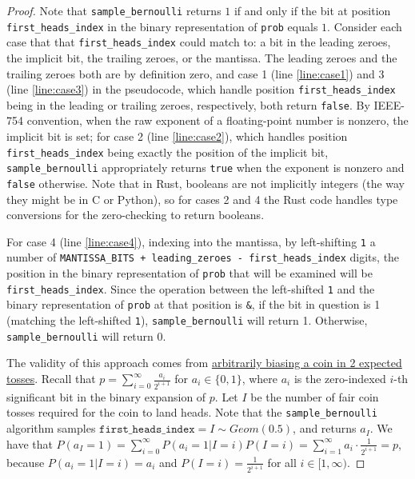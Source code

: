 \documentclass[11pt,a4paper]{article}
\theoremstyle{definition}
\begin{document}
\begin{proof}
Note that \texttt{sample\_bernoulli} returns $1$ if and only if the bit at position \texttt{first\_heads\_index} in the binary representation of \texttt{prob} equals $1$. Consider each case that that \texttt{first\_heads\_index} could match to: a bit in the leading zeroes, the implicit bit, the trailing zeroes, or the mantissa. The leading zeroes and the trailing zeroes both are by definition zero, and case 1 (line \ref{line:case1}) and 3 (line \ref{line:case3}) in the pseudocode, which handle position \texttt{first\_heads\_index} being in the leading or trailing zeroes, respectively, both return \texttt{false}. By IEEE-754 convention, when the raw exponent of a floating-point number is nonzero, the implicit bit is set; for case 2 (line \ref{line:case2}), which handles position \texttt{first\_heads\_index} being exactly the position of the implicit bit, \texttt{sample\_bernoulli} appropriately returns \texttt{true} when the exponent is nonzero and \texttt{false} otherwise. Note that in Rust, booleans are not implicitly integers (the way they might be in C or Python), so for cases 2 and 4 the Rust code handles type conversions for the zero-checking to return booleans. 

For case 4 (line \ref{line:case4}), indexing into the mantissa, by left-shifting \texttt{1} a number of \texttt{MANTISSA\_BITS + leading\_zeroes - first\_heads\_index} digits, the position in the binary representation of \texttt{prob} that will be examined will be \texttt{first\_heads\_index}. Since the operation between the left-shifted \texttt{1} and the binary representation of \texttt{prob} at that position is \texttt{\&}, if the bit in question is 1 (matching the left-shifted \texttt{1}), \texttt{sample\_bernoulli} will return 1. Otherwise, \texttt{sample\_bernoulli} will return 0. 

The validity of this approach comes from \href{https://web.archive.org/web/20160418185834/https://amakelov.wordpress.com/2013/10/10/arbitrarily-biasing-a-coin-in-2-expected-tosses/}{arbitrarily biasing a coin in 2 expected tosses}. Recall that $p = \sum_{i = 0}^\infty \frac{a_i}{2^{i + 1}}$ for $a_i \in \{0, 1\}$, where $a_i$ is the zero-indexed $i$-th significant bit in the binary expansion of $p$. Let $I$ be the number of fair coin tosses required for the coin to land heads. Note that the \texttt{sample\_bernoulli} algorithm samples $\texttt{first\_heads\_index} = I \sim Geom(0.5)$, and returns $a_I$.  We have that $P(a_I = 1) = \sum_{i = 0}^\infty P(a_i = 1|I = i)P(I = i) = \sum_{i = 1}^\infty a_i \cdot \frac{1}{2^{i + 1}} = p$, because $P(a_i = 1|I = i) = a_i$ and $P(I = i) = \frac{1}{2^{i + 1}}$ for all $i \in [1, \infty)$. 


\end{proof}
\end{document}

